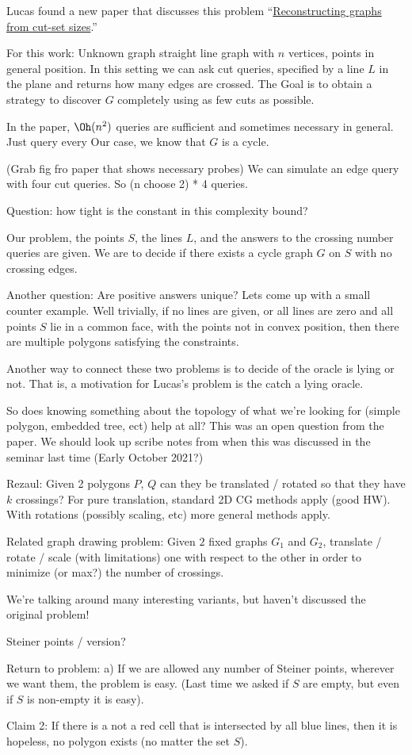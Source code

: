 \documentclass{article}
\begin{document}
Lucas found a new paper that discusses this problem ``\href{https://www.sciencedirect.com/science/article/abs/pii/0020019089900124}{Reconstructing graphs from cut-set sizes}.''

For this work:
Unknown graph straight line graph with $n$ vertices, points in general position.
In this setting we can ask cut queries, specified by a line $L$ in the plane and returns how many edges are crossed.
The Goal is to obtain a strategy to discover $G$ completely using as few cuts as possible.

In the paper, $\Oh(n^2)$ queries are sufficient and sometimes necessary in general.
Just query every 
Our case, we know that $G$ is a cycle.

(Grab fig fro paper that shows necessary probes)
We can simulate an edge query with four cut queries.
So (n choose 2) * 4 queries.

Question: how tight is the constant in this complexity bound?

Our problem, the points $S$, the lines $L$, and the answers to the crossing number queries are given. 
We are to decide if there exists a cycle graph $G$ on $S$ with no crossing edges.

Another question: Are positive answers unique?
Lets come up with a small counter example.
Well trivially, if no lines are given, or all lines are zero and all points $S$ lie in a common face, 
with the points not in convex position, then there are multiple polygons satisfying the constraints.

Another way to connect these two problems is to decide of the oracle is lying or not. 
That is, a motivation for Lucas's problem is the catch a lying oracle.

So does knowing something about the topology of what we're looking for (simple polygon, embedded tree, ect) help at all?
This was an open question from the paper.
We should look up scribe notes from when this was discussed in the seminar last time (Early October 2021?)

Rezaul: Given 2 polygons $P$, $Q$ can they be translated / rotated so that they have $k$ crossings?
For pure translation, standard 2D CG methods apply (good HW).
With rotations (possibly scaling, etc) more general methods apply.

Related graph drawing problem: Given $2$ fixed graphs $G_1$ and $G_2$, translate / rotate / scale (with limitations) one with respect to the other
in order to minimize (or max?) the number of crossings. 

We're talking around many interesting variants, but haven't discussed the original problem!

Steiner points / version?

Return to problem:
a) If we are allowed any number of Steiner points, wherever we want them, the problem is easy.
(Last time we asked if $S$ are empty, but even if $S$ is non-empty it is easy).

Claim 2:
If there is a not a red cell that is intersected by all blue lines, then it is hopeless, no polygon exists (no matter the set $S$).
\end{document}
